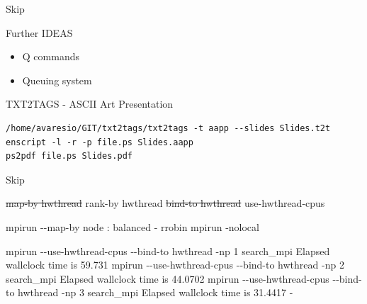 \documentclass[ignorenonframetext,]{beamer}
\providecommand{\tightlist}{%
  \setlength{\itemsep}{0pt}\setlength{\parskip}{0pt}}
\begin{document}
\begin{frame}[fragile]{Skip}

\begin{block}{Further IDEAS}

\begin{itemize}
\tightlist
\item
  Q commands
\item
  Queuing system
\end{itemize}

\end{block}

\begin{block}{TXT2TAGS - ASCII Art Presentation}

\begin{verbatim}
/home/avaresio/GIT/txt2tags/txt2tags -t aapp --slides Slides.t2t
enscript -l -r -p file.ps Slides.aapp
ps2pdf file.ps Slides.pdf
\end{verbatim}

\end{block}

\end{frame}

\begin{frame}{Skip}

\sout{map-by hwthread }rank-by hwthread \sout{bind-to hwthread
}use-hwthread-cpus

mpirun -\/-map-by node : balanced - rrobin mpirun -nolocal

mpirun -\/-use-hwthread-cpus -\/-bind-to hwthread -np 1 search\_mpi
Elapsed wallclock time is 59.731 mpirun -\/-use-hwthread-cpus
-\/-bind-to hwthread -np 2 search\_mpi Elapsed wallclock time is 44.0702
mpirun -\/-use-hwthread-cpus -\/-bind-to hwthread -np 3 search\_mpi
Elapsed wallclock time is 31.4417 -

\end{frame}
\end{document}
